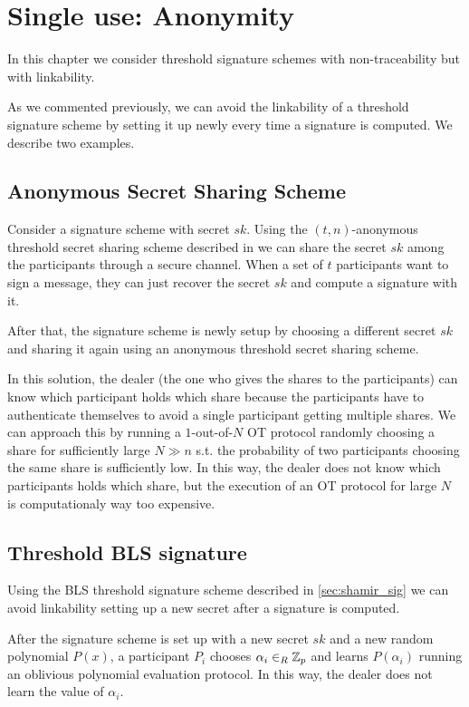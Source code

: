 \chapter{Single use: Anonymity}
\label{chap:single}
In this chapter we consider threshold signature schemes with non-traceability but with linkability.

As we commented previously, we can avoid the linkability of a threshold signature scheme by setting it up newly every time a signature is computed. We describe two examples.

\section{Anonymous Secret Sharing Scheme}
Consider a signature scheme with secret $sk$. Using the $(t,n)$-anonymous threshold secret sharing scheme described in \cite{BlSt97} we can share the secret $sk$ among the participants through a secure channel. When a set of $t$ participants want to sign a message, they can just recover the secret $sk$ and compute a signature with it.

After that, the signature scheme is newly setup by choosing a different secret $sk$ and sharing it again using an anonymous threshold secret sharing scheme.

In this solution, the dealer (the one who gives the shares to the participants) can know which participant holds which share because the participants have to authenticate themselves to avoid a single participant getting multiple shares. We can approach this by running a $1$-out-of-$N$ OT protocol randomly choosing a share for sufficiently large $N \gg n$ s.t. the probability of two participants choosing the same share is sufficiently low. In this way, the dealer does not know which participants holds which share, but the execution of an OT protocol for large $N$ is computationaly way too expensive.

\section{Threshold BLS signature}
Using the BLS threshold signature scheme described in \ref{sec:shamir_sig} we can avoid linkability setting up a new secret after a signature is computed.

After the signature scheme is set up with a new secret $sk$ and a new random polynomial $P(x)$, a participant $P_i$ chooses $\alpha_i \in_R {\mathbb Z}_p$ and learns $P(\alpha_i)$ running an oblivious polynomial evaluation protocol. In this way, the dealer does not learn the value of $\alpha_i$.

